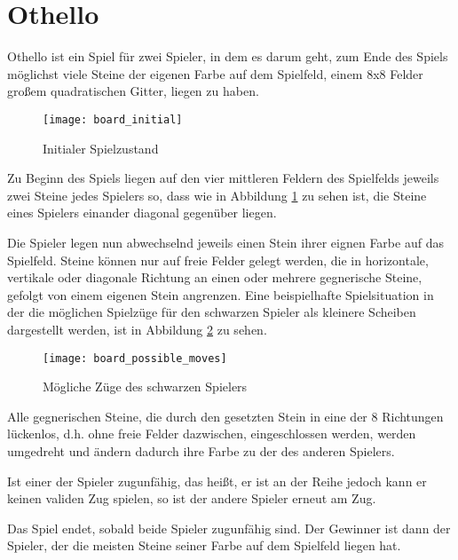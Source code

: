 \section{Othello}

Othello ist ein Spiel für zwei Spieler, in dem es darum geht, zum Ende des Spiels möglichst viele Steine der eigenen Farbe auf dem Spielfeld, einem 8x8 Felder großem quadratischen Gitter, liegen zu haben.

\begin{figure}[h]
    \centering
    \texttt{[image: board\_initial]}
    \caption{Initialer Spielzustand}
    \label{fig:board_initial}
\end{figure}

Zu Beginn des Spiels liegen auf den vier mittleren Feldern des Spielfelds jeweils zwei Steine jedes Spielers so, dass wie in Abbildung \ref{fig:board_initial} zu sehen ist,
die Steine eines Spielers einander diagonal gegenüber liegen.

Die Spieler legen nun abwechselnd jeweils einen Stein ihrer eignen Farbe auf das Spielfeld.
Steine können nur auf freie Felder gelegt werden, die in horizontale, vertikale oder diagonale Richtung an einen oder mehrere gegnerische Steine, gefolgt von einem eigenen Stein angrenzen.
Eine beispielhafte Spielsituation in der die möglichen Spielzüge für den schwarzen Spieler als kleinere Scheiben dargestellt werden, ist in Abbildung \ref{fig:board_possible_moves} zu sehen. 

\begin{figure}[h]
    \centering
    \texttt{[image: board\_possible\_moves]}
    \caption{Mögliche Züge des schwarzen Spielers}
    \label{fig:board_possible_moves}
\end{figure}

Alle gegnerischen Steine, die durch den gesetzten Stein in eine der 8 Richtungen lückenlos, d.h. ohne freie Felder dazwischen, eingeschlossen werden, werden umgedreht und ändern dadurch ihre Farbe zu der des anderen Spielers.

Ist einer der Spieler zugunfähig, das heißt, er ist an der Reihe jedoch kann er keinen validen Zug spielen, so ist der andere Spieler erneut am Zug.

Das Spiel endet, sobald beide Spieler zugunfähig sind. Der Gewinner ist dann der Spieler, der die meisten Steine seiner Farbe auf dem Spielfeld liegen hat.
\cite{worldothellorules}
